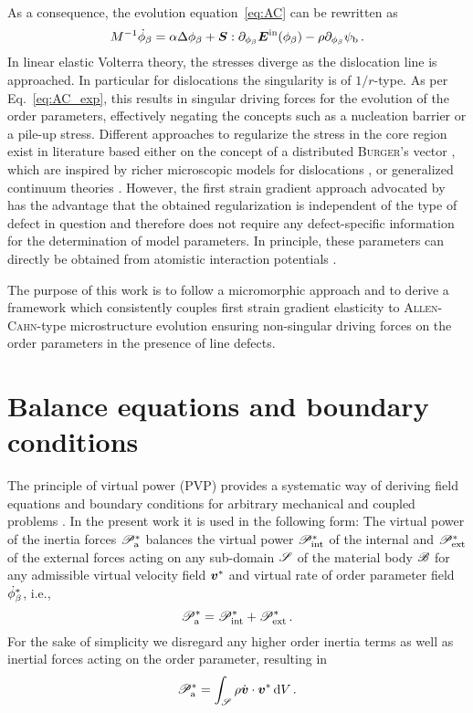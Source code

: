 \documentclass[preprint,review,3p,times,authoryear]{elsarticle}
\begin{document}
As a consequence, the evolution equation~\eqref{eq:AC} can be rewritten as
\begin{equation}
  \label{eq:AC_exp}
  M^{-1}\sdot\phi_{\beta} = \alpha\Delta\phi_{\beta} + \tS:\pder{\tEtr}{\phi_{\beta}} -  \rho\pder{\psi_{\ub}}{\phi_{\beta}}\,.
\end{equation}
In linear elastic Volterra theory, the stresses diverge as the dislocation line is approached. In particular for dislocations the singularity is of $1/r$-type. As per Eq.~\eqref{eq:AC_exp}, this results in singular driving forces for the evolution of the order parameters, effectively negating the concepts such as a nucleation barrier or a pile-up stress. Different approaches to regularize the stress in the core region exist in literature based either on the concept of a distributed \textsc{Burger}'s vector \citep{Lothe:1992,Cai:2006}, which are inspired by richer microscopic models for dislocations \citep{Peierls:1940,Nabarro:1947}, or generalized continuum theories \citep{Lazar:2005,Lazar:2006,Lazar:2015,Po:2018}. However, the first strain gradient approach advocated by \citet{Po:2018} has the advantage that the obtained regularization is independent of the type of defect in question and therefore does not require any defect-specific information for the determination of model parameters. In principle, these parameters can directly be obtained from atomistic interaction potentials \citep{Admal:2017}.

The purpose of this work is to follow a micromorphic approach and to derive a framework which consistently couples first strain gradient elasticity to \textsc{Allen-Cahn}-type microstructure evolution ensuring non-singular driving forces on the order parameters in the presence of line defects.

\section{Balance equations and boundary conditions}
\label{sec:therm-coupl}

The principle of virtual power (PVP) provides a systematic way of deriving field equations and boundary conditions for arbitrary mechanical and coupled problems \citep[cf.][]{Maugin:1980lr,Germain:1973mi,Del-Piero:2009pi}. In the present work it is used in the following form: The virtual power of the inertia forces $\mathscr{P}^{*}_{\text{a}}$ balances the virtual power $\mathscr{P}^{*}_{\text{int}}$ of the internal and $\mathscr{P}^{*}_{\text{ext}}$ of the external forces acting on any sub-domain $\mathscr{S}$ of the material body $\mathscr{B}$ for any admissible virtual velocity field $\boldsymbol{v}^{*}$ and virtual rate of order parameter field $\vopv_{\beta}$, i.e.,
\begin{equation}
  \label{eq:PVP}
  \mathscr{P}^{*}_{\text{a}} = \mathscr{P}^{*}_{\text{int}} + \mathscr{P}^{*}_{\text{ext}}\,.
\end{equation}
For the sake of simplicity we disregard any higher order inertia terms \cite{Mindlin:1964aa} as well as inertial forces acting on the order parameter, resulting in
\begin{equation}
  \label{eq:power_inertia}
  \mathscr{P}^{*}_{\text{a}} = \int_{\mathscr{S}} \rho \dot{\boldsymbol{v}} \cdot \boldsymbol{v}^{*} \,\text{d} V\,.
\end{equation}
\end{document}
